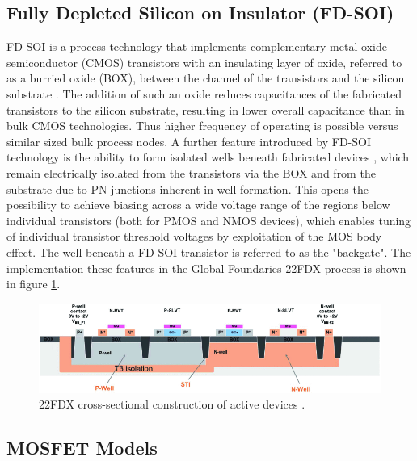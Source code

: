 	\subsection{Fully Depleted Silicon on Insulator (FD-SOI)}
	FD-SOI is a process technology that implements complementary metal oxide semiconductor (CMOS) transistors with an insulating layer of oxide, referred to as a burried oxide (BOX), between the channel of the transistors and the silicon substrate \cite{Planes2012}. The addition of such an oxide reduces capacitances of the fabricated transistors to the silicon substrate, resulting in lower overall capacitance than in bulk CMOS technologies. Thus higher frequency of operating is possible versus similar sized bulk process nodes. A further feature introduced by FD-SOI technology is the ability to form isolated wells beneath fabricated devices \cite{Wiatr2019}, which remain electrically isolated from the transistors via the BOX and from the substrate due to PN junctions inherent in well formation. This opens the possibility to achieve biasing across a wide voltage range of the regions below individual transistors (both for PMOS and NMOS devices), which enables tuning of individual transistor threshold voltages by exploitation of the MOS body effect. The well beneath a FD-SOI transistor is referred to as the "backgate". The implementation these features in the Global Foundaries 22FDX process is shown in figure \ref{fig:22fdx_wells}. 
	
			\begin{figure}[htb!]
			        \centering
			        \includegraphics[width=1\textwidth, angle=0]{./figs/theory/wiatr1-p4-wiatr-large}
			    \caption{22FDX cross-sectional construction of active devices \cite{Wiatr2019}.}
			    \label{fig:22fdx_wells}
			\end{figure}
	
	\subsection{MOSFET Models}

